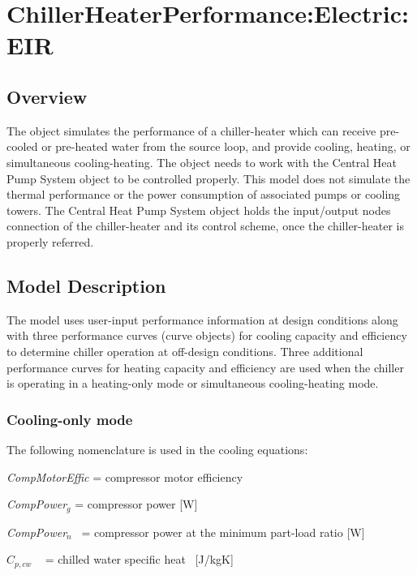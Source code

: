 \section{ChillerHeaterPerformance:Electric:EIR }\label{chillerheaterperformanceelectriceir}

\subsection{Overview}\label{overview-008}

The object simulates the performance of a chiller-heater which can receive pre-cooled or pre-heated water from the source loop, and provide cooling, heating, or simultaneous cooling-heating. The object needs to work with the Central Heat Pump System object to be controlled properly. This model does not simulate the thermal performance or the power consumption of associated pumps or cooling towers. The Central Heat Pump System object holds the input/output nodes connection of the chiller-heater and its control scheme, once the chiller-heater is properly referred.

\subsection{Model Description}\label{model-description-005}

The model uses user-input performance information at design conditions along with three performance curves (curve objects) for cooling capacity and efficiency to determine chiller operation at off-design conditions. Three additional performance curves for heating capacity and efficiency are used when the chiller is operating in a heating-only mode or simultaneous cooling-heating mode.

\subsubsection{Cooling-only mode}\label{cooling-only-mode}

The following nomenclature is used in the cooling equations:

\emph{CompMotorEffic} = compressor motor efficiency

\emph{CompPower\(_{g}\)} = compressor power {[}W{]}

\emph{CompPower\(_{n}\)}~ = compressor power at the minimum part-load ratio {[}W{]}

\({C_{p,cw}}\) ~ = chilled water specific heat~ {[}J/kgK{]}

